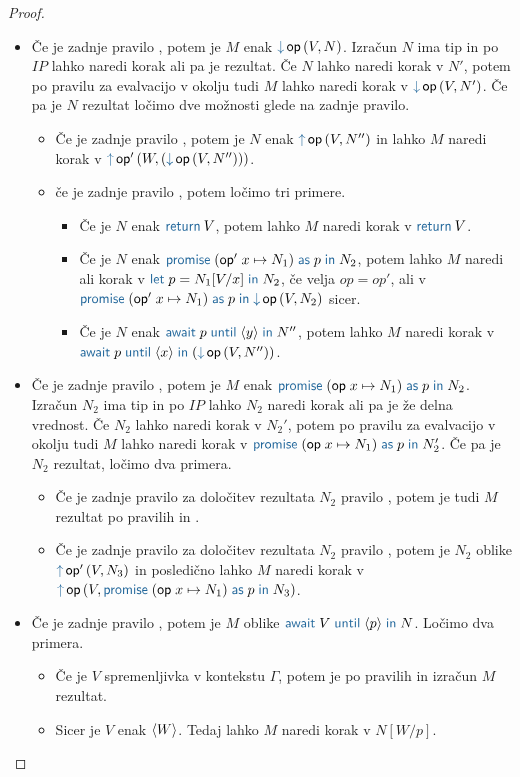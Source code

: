 \begin{proof}
\begin{itemize}
		\item Če je zadnje pravilo , potem je $M$ enak $\tmopin{op}{V}{N}$.
		Izračun $N$ ima tip in po $IP$ lahko naredi korak ali pa je rezultat.
		Če $N$ lahko naredi korak v $N'$, potem po pravilu za evalvacijo v okolju tudi $M$ lahko naredi korak v $\tmopin{op}{V}{N'}$. 
		Če pa je $N$ rezultat ločimo dve možnosti glede na zadnje pravilo.
		\begin{itemize}
			\item Če je zadnje pravilo , potem je $N$ enak $\tmopout{op}{V}{N''}$ in lahko $M$ naredi korak v $\tmopout{op'}{W}{(\tmopin{op}{V}{N''})}$.
			\item če je zadnje pravilo , potem ločimo tri primere.
			\begin{itemize}
				\item Če je $N$ enak $\tmreturn{V}$, potem lahko $M$ naredi korak v $\tmreturn{V}$.
				\item Če je $N$ enak $\tmwith{op'}{x}{N_1}{p}{N_2}$, potem lahko $M$ naredi ali korak v $\tmlet{p}{N_1[V/x]}{N_2}$, če velja $op = op'$, ali v $\tmwith{op'}{x}{N_1}{p}{\tmopin{op}{V}{N_2}}$ sicer.
				\item Če je $N$ enak $\tmawait{p}{y}{N''}$, potem lahko $M$ naredi korak v $\tmawait{p}{x}{(\tmopin{op}{V}{N''})}$.
			\end{itemize}
		\end{itemize}
		
		
		\item Če je zadnje pravilo , potem je $M$ enak $\tmwith{op}{x}{N_1}{p}{N_2}$.
		Izračun $N_2$ ima tip in po $IP$ lahko $N_2$ naredi korak ali pa je že delna vrednost.
		Če $N_2$ lahko naredi korak v $N_2'$, potem po pravilu za evalvacijo v okolju tudi $M$ lahko naredi korak v $\tmwith{op}{x}{N_1}{p}{N_2'}$.
		Če pa je $N_2$ rezultat, ločimo dva primera.
		\begin{itemize}
			\item Če je zadnje pravilo za določitev rezultata $N_2$ pravilo , potem je tudi $M$ rezultat po pravilih  in .
			\item Če je zadnje pravilo za določitev rezultata $N_2$ pravilo , potem je $N_2$ oblike $\tmopout{op'}{V}{N_3}$ in posledično lahko $M$ naredi korak v $\tmopout{op}{V}{\tmwith{op}{x}{N_1}{p}{N_3}}$.
		\end{itemize}
		 
		
		\item Če je zadnje pravilo , potem je $M$ oblike $\tmawait{V}{p}{N}$.
		Ločimo dva primera.
		\begin{itemize}
			\item Če je $V$ spremenljivka v kontekstu $\Gamma$, potem je po pravilih  in  izračun $M$ rezultat.
			\item Sicer je $V$ enak $\langle W \rangle$. Tedaj lahko $M$ naredi korak v $N[W/p]$.
		\end{itemize}
		

\end{itemize}
\end{proof}
